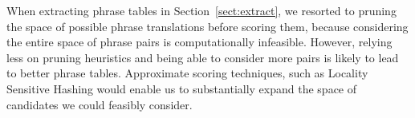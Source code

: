 \documentclass[11pt]{article}
\newcommand{\secref}[1]{Section~\ref{#1}}
\begin{document}
When extracting phrase tables in \secref{sect:extract}, we resorted to pruning the space of possible phrase translations before scoring them, because considering the entire space of phrase pairs is computationally infeasible.  However, relying less on pruning heuristics and being able to consider more pairs is likely to lead to better phrase tables.  Approximate scoring techniques, such as Locality Sensitive Hashing \cite{Charikar2002,VanDurme2010} would enable us to substantially expand the space of candidates we could feasibly consider.







\end{document}
